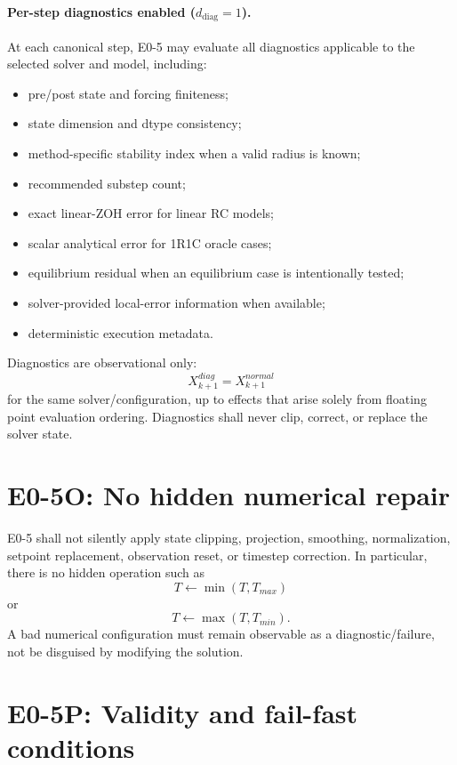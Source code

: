 \documentclass[11pt]{article}
\newcommand{\diagmode}{d_{\mathrm{diag}}}
\begin{document}
\paragraph{Per-step diagnostics enabled ($\diagmode=1$).}
At each canonical step, E0-5 may evaluate all diagnostics applicable to the
selected solver and model, including:
\begin{itemize}[leftmargin=*]
\item pre/post state and forcing finiteness;
\item state dimension and dtype consistency;
\item method-specific stability index when a valid radius is known;
\item recommended substep count;
\item exact linear-ZOH error for linear RC models;
\item scalar analytical error for 1R1C oracle cases;
\item equilibrium residual when an equilibrium case is intentionally tested;
\item solver-provided local-error information when available;
\item deterministic execution metadata.
\end{itemize}
Diagnostics are observational only:
\[
\boxed{
X_{k+1}^{diag}=X_{k+1}^{normal}
}
\]
for the same solver/configuration, up to effects that arise solely from floating
point evaluation ordering. Diagnostics shall never clip, correct, or replace the
solver state.

\section{E0-5O: No hidden numerical repair}

E0-5 shall not silently apply state clipping, projection, smoothing,
normalization, setpoint replacement, observation reset, or timestep correction.
In particular, there is no hidden operation such as
\[
T\leftarrow\min(T,T_{max})
\]
or
\[
T\leftarrow\max(T,T_{min}).
\]
A bad numerical configuration must remain observable as a diagnostic/failure,
not be disguised by modifying the solution.

\section{E0-5P: Validity and fail-fast conditions}
\end{document}
